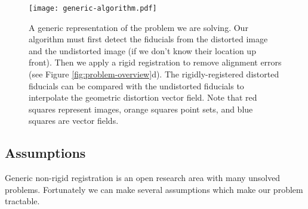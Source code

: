 \documentclass[12pt]{article}
\begin{document}
\begin{figure}
    \centering
    \texttt{[image: generic-algorithm.pdf]}
    \caption{A generic representation of the problem we are solving.  Our algorithm must first detect the fiducials from the distorted image and the undistorted image (if we don't know their location up front). Then we apply a rigid registration to remove alignment errors (see Figure \ref{fig:problem-overview}d). The rigidly-registered distorted fiducials can be compared with the undistorted fiducials to interpolate the geometric distortion vector field.  Note that red squares represent images, orange squares point sets, and blue squares are vector fields.}
    \label{fig:generic-algorithm}
\end{figure}


\subsection{Assumptions}

Generic non-rigid registration is an open research area with many unsolved problems.  Fortunately we can make several assumptions which make our problem tractable.
\end{document}
